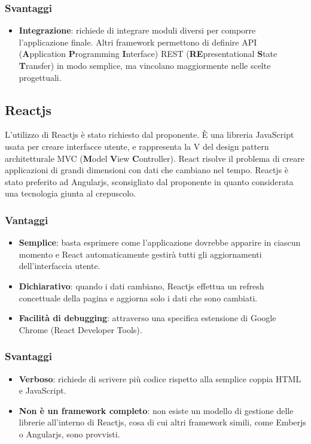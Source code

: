 \subsubsection{Svantaggi}
\begin{itemize}
\item \textbf{Integrazione}: richiede di integrare moduli diversi per comporre l'applicazione finale. Altri framework permettono di definire API (\textbf{A}pplication \textbf{P}rogramming \textbf{I}nterface) REST (\textbf{RE}presentational \textbf{S}tate \textbf{T}ransfer) in modo semplice, ma vincolano maggiormente nelle scelte progettuali.
\end{itemize}

\subsection{Reactjs}
L'utilizzo di Reactjs \`e stato richiesto dal proponente. \`E una libreria JavaScript usata per creare interfacce utente, e rappresenta la V del design pattern architetturale MVC (\textbf{M}odel \textbf{V}iew \textbf{C}ontroller). React risolve il problema di creare applicazioni di grandi dimensioni con dati che cambiano nel tempo.
Reactjs \`e stato preferito ad Angularjs, sconsigliato dal proponente in quanto considerata una tecnologia giunta al crepuscolo.
\subsubsection{Vantaggi}
\begin{itemize}
\item \textbf{Semplice}: basta esprimere come l'applicazione dovrebbe apparire in ciascun momento e React automaticamente gestir\`a tutti gli aggiornamenti dell'interfaccia utente.
\item \textbf{Dichiarativo}: quando i dati cambiano, Reactjs effettua un refresh concettuale della pagina e aggiorna solo i dati che sono cambiati.
\item \textbf{Facilit\`a di debugging}: attraverso una specifica estensione di Google Chrome (React Developer Tools).
\end{itemize}
\subsubsection{Svantaggi}
\begin{itemize}
\item \textbf{Verboso}: richiede di scrivere pi\`u codice rispetto alla semplice coppia HTML e JavaScript.
\item \textbf{Non \`e un framework completo}: non esiste un modello di gestione delle librerie all'interno di Reactjs, cosa di cui altri framework simili, come Emberjs o Angularjs, sono provvisti.
\end{itemize}
